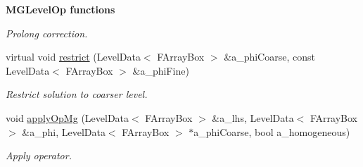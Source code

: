 \begin{Indent}{\bf M\-G\-Level\-Op functions}
\begin{DoxyCompactItemize}
\begin{DoxyCompactList}\small\item\em Prolong correction. \end{DoxyCompactList}\item 
\hypertarget{class_a_m_r_non_linear_multi_comp_op_a7825a1c5e9bffc3fefe6b5b7fb1458f7}{virtual void \hyperlink{class_a_m_r_non_linear_multi_comp_op_a7825a1c5e9bffc3fefe6b5b7fb1458f7}{restrict} (Level\-Data$<$ F\-Array\-Box $>$ \&a\-\_\-phi\-Coarse, const Level\-Data$<$ F\-Array\-Box $>$ \&a\-\_\-phi\-Fine)}\label{class_a_m_r_non_linear_multi_comp_op_a7825a1c5e9bffc3fefe6b5b7fb1458f7}

\begin{DoxyCompactList}\small\item\em Restrict solution to coarser level. \end{DoxyCompactList}\item 
\hypertarget{class_a_m_r_non_linear_multi_comp_op_aee81544614b579b9ca7cb03c6e92f9cd}{void \hyperlink{class_a_m_r_non_linear_multi_comp_op_aee81544614b579b9ca7cb03c6e92f9cd}{apply\-Op\-Mg} (Level\-Data$<$ F\-Array\-Box $>$ \&a\-\_\-lhs, Level\-Data$<$ F\-Array\-Box $>$ \&a\-\_\-phi, Level\-Data$<$ F\-Array\-Box $>$ $\ast$a\-\_\-phi\-Coarse, bool a\-\_\-homogeneous)}\label{class_a_m_r_non_linear_multi_comp_op_aee81544614b579b9ca7cb03c6e92f9cd}

\begin{DoxyCompactList}\small\item\em Apply operator. \end{DoxyCompactList}\end{DoxyCompactItemize}
\end{Indent}
